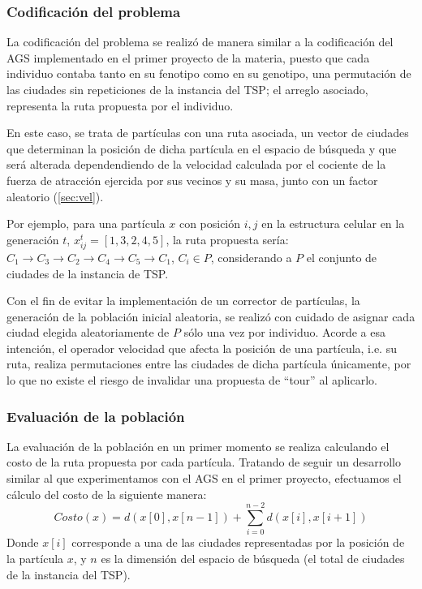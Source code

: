 \documentclass[12pt]{article}
\begin{document}
\subsubsection*{Codificación del problema}
La codificación del problema se realizó de manera similar a la codificación del AGS implementado en el primer proyecto de la materia, puesto que
cada individuo contaba tanto en su fenotipo como en su genotipo, una permutación de las ciudades sin repeticiones de la instancia del TSP; el arreglo asociado, representa la ruta propuesta por el individuo.

En este caso, se trata de partículas con una ruta asociada, un vector de ciudades que determinan la posición de dicha partícula en el espacio de
búsqueda y que será alterada dependendiendo de la velocidad calculada por el cociente de la fuerza de atracción ejercida por sus vecinos y su masa,
junto con un factor aleatorio (\ref{sec:vel}).

Por ejemplo, para una partícula $x$ con posición $i,j$ en la estructura celular en la generación $t$,
$x_{ij}^t = [1,3,2,4,5]$, la ruta propuesta sería: $C_1 \to C_3 \to C_2 \to C_4 \to C_5 \to C_1$, $C_i \in P$, considerando a $P$ el conjunto de ciudades de la instancia de TSP.

Con el fin de evitar la implementación de un corrector de partículas, la generación de la población inicial aleatoria, se realizó con cuidado de asignar cada ciudad elegida aleatoriamente de $P$ sólo una vez por individuo. Acorde a esa intención, el operador velocidad que afecta la posición de una partícula, i.e. su ruta, realiza permutaciones entre las ciudades de dicha partícula únicamente, por lo que no existe el riesgo de invalidar una propuesta de ``tour'' al aplicarlo.

\subsubsection*{Evaluación de la población}
La evaluación de la población en un primer momento se realiza calculando el costo de la ruta propuesta por cada partícula. Tratando de seguir un
desarrollo similar al que experimentamos con el AGS en el primer proyecto, efectuamos el cálculo del costo de la siguiente manera:
\begin{equation}
  Costo(x) = d(x[0],x[n-1]) + \sum\limits_{i=0}^{n-2} d(x[i],x[i+1])
\end{equation}
Donde $x[i]$ corresponde a una de las ciudades representadas por la posición de la partícula $x$, y $n$ es la dimensión del espacio de búsqueda (el total de ciudades de la instancia del TSP).
\end{document}

